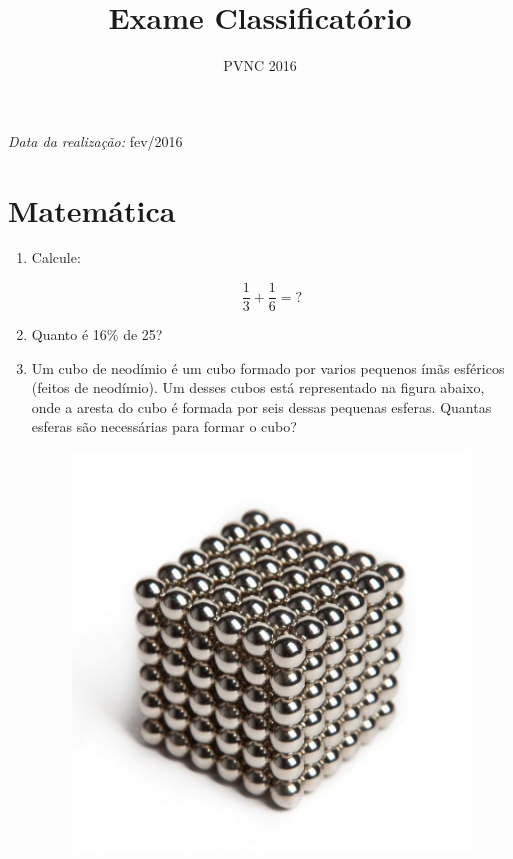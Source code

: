 \documentclass[a4paper,11pt,oneside,brazilian]{article}
\begin{document}
\title{Exame Classificatório}
\date{PVNC 2016}
\maketitle


\begin{flushright}
\emph{Data da realização:} fev/2016
\end{flushright}

\section{Matemática}
\begin{enumerate}[{A}1]
  
  \item Calcule:
  
  \[\frac{1}{3} + \frac{1}{6} = ?\]
  
% 
\item Quanto é 16\% de 25?

\item Um cubo de neodímio é um cubo formado por varios pequenos ímãs esféricos
(feitos de neodímio). Um desses cubos está representado na figura abaixo, onde a
aresta do cubo é formada por seis dessas pequenas esferas. Quantas esferas são
necessárias para formar o cubo?

	\begin{figure}[H]
		\centering
		\includegraphics[width=0.7\columnwidth]{neocubes}
	\end{figure}


\end{enumerate}
\end{document}
